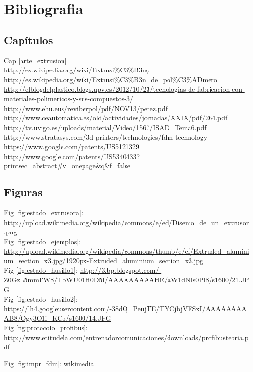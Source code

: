 \chapter{Bibliografia}
\label{bibliografia}
\section{Capítulos}
Cap \ref{arte_extrusion}\\
\url{http://es.wikipedia.org/wiki/Extrusi%C3%B3nç}\\
\url{http://es.wikipedia.org/wiki/Extrusi%C3%B3n_de_pol%C3%ADmero}\\
\url{http://elblogdelplastico.blogs.upv.es/2012/10/23/tecnologias-de-fabricacion-con-materiales-polimericos-y-sus-compuestos-3/}\\
\url{http://www.ehu.eus/reviberpol/pdf/NOV13/perez.pdf}\\

\url{http://www.ceautomatica.es/old/actividades/jornadas/XXIX/pdf/264.pdf}\\
\url{http://tv.uvigo.es/uploads/material/Video/1567/ISAD_Tema6.pdf}\\



\url{http://www.stratasys.com/3d-printers/technologies/fdm-technology}\\

\url{https://www.google.com/patents/US5121329}\\

\url{http://www.google.com/patents/US5340433?printsec=abstract#v=onepage&q&f=false}\\
\section{Figuras}
Fig \ref{fig:estado_extrusora}:  \url{http://upload.wikimedia.org/wikipedia/commons/e/ed/Disenio_de_un_extrusor.png}\\
Fig \ref{fig:estado_ejemplos}: \url{http://upload.wikimedia.org/wikipedia/commons/thumb/e/ef/Extruded_aluminium_section_x3.jpg/1920px-Extruded_aluminium_section_x3.jpg}\\
Fig \ref{fig:estado_husillo1}: \url{http://3.bp.blogspot.com/-Z0GzL5mmFW8/TbWU01H0D5I/AAAAAAAAAHE/aW1dNIs0Pl8/s1600/21.JPG}\\
Fig \ref{fig:estado_husillo2}: \url{https://lh4.googleusercontent.com/-38dQ_PeujTE/TYCjbjVFSxI/AAAAAAAAAB8/Ogy3O1i_KCo/s1600/14.JPG}\\
Fig \ref{fig:protocolo_profibus}: \url{http://www.etitudela.com/entrenadorcomunicaciones/downloads/profibusteoria.pdf}

Fig \ref{fig:impr_fdm}: 
\href{http://upload.wikimedia.org/wikipedia/commons/4/42/FDM_by_Zureks.png}{wikimedia}